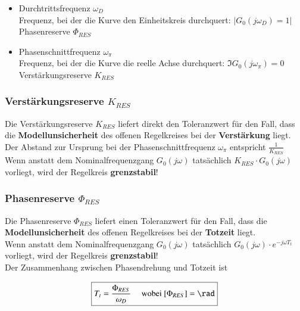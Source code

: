 \begin{itemize}
    \item Durchtrittsfrequenz $\omega_{D}$ \\
        Frequenz, bei der die Kurve den Einheitskreis durchquert: $| G_{0}(j \omega_{D}) = 1 |$ \\
        \textrightarrow Phasenreserve $\Phi_{RES}$
    
    \item Phasenschnittfrequenz $\omega_{\pi}$ \\
        Frequenz, bei der die Kurve die reelle Achse durchquert: $\Im{G_{0}(j \omega_{\pi})} = 0$\\
        \textrightarrow Verstärkungsreserve $K_{RES}$
\end{itemize}


\subsubsection{Verstärkungsreserve $K_{RES}$}

Die Verstärkungsreserve $K_{RES}$ liefert direkt den Toleranzwert für den Fall, dass die \textbf{Modellunsicherheit} des 
offenen Regelkreises bei der \textbf{Verstärkung} liegt. \\
Der Abstand zur Ursprung bei der Phasenschnittfrequenz $\omega_{\pi}$ entspricht $\frac{1}{K_{RES}}$ \\
\textrightarrow Wenn anstatt dem Nominalfrequenzgang $G_0(j \omega)$ tatsächlich $K_{RES} \cdot G_0(j \omega)$ vorliegt, wird der
Regelkreis \textbf{grenzstabil}!


\subsubsection{Phasenreserve $\Phi_{RES}$}

Die Phasenreserve $\Phi_{RES}$ liefert einen Toleranzwert für den Fall, dass die \textbf{Modellunsicherheit} des
offenen Regelkreises bei der \textbf{Totzeit} liegt. \\
\textrightarrow Wenn anstatt dem Nominalfrequenzgang $G_0(j \omega)$ tatsächlich $G_0(j \omega) \cdot e^{- j \omega T_t}$ vorliegt, 
wird der Regelkreis \textbf{grenzstabil}! \\

Der Zusammenhang zwischen Phasendrehung und Totzeit ist

$$ \boxed{ T_t = \frac{\Phi_{RES}}{\omega_D}  \quad \text{ wobei } [\Phi_{RES}] = \rad } $$



